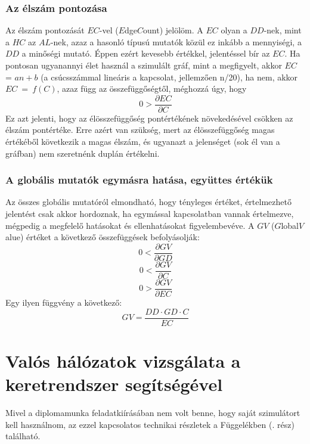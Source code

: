     \subsubsection{Az élszám pontozása}
    Az élszám pontozását $EC$-vel ($E$dge$C$ount) jelölöm. A $EC$ olyan a $DD$-nek, mint a $HC$ az $AL$-nek, azaz a hasonló típusú mutatók közül ez inkább a mennyiségi, a $DD$ a minőségi mutató. Éppen ezért kevesebb értékkel, jelentéssel bír az $EC$. Ha pontosan ugyanannyi élet használ a szimulált gráf, mint a megfigyelt, akkor $EC$ = $an + b$ (a csúcsszámmal lineáris a kapcsolat, jellemzően n/20), ha nem, akkor $EC~=~f(C)$, azaz függ az összefüggőségtől, méghozzá úgy, hogy
    $$0 > \frac{\partial EC}{\partial C}$$
    Ez azt jelenti, hogy az élösszefüggőség pontértékének növekedésével csökken az élszám pontértéke. Erre azért van szükség, mert az élösszefüggőség magas értékéből következik a magas élszám, és ugyanazt a jelenséget (sok él van a gráfban) nem szeretnénk duplán értékelni.

    \subsubsection{A globális mutatók egymásra hatása, együttes értékük}
    Az összes globális mutatóról elmondható, hogy tényleges értéket, értelmezhető jelentést csak akkor hordoznak, ha egymással kapcsolatban vannak értelmezve, mégpedig a megfelelő hatásokat és ellenhatásokat figyelembevéve. A $GV$ ($G$lobal$V$alue) értéket a következő összefüggések befolyásolják:
    $$0 < \frac{\partial GV}{\partial GD}$$
    $$0 < \frac{\partial GV}{\partial C}$$
    $$0 > \frac{\partial GV}{\partial EC}$$
    Egy ilyen függvény a következő:
    $$GV = \frac{DD \cdot GD \cdot C}{EC}$$

  \section{Valós hálózatok vizsgálata a keretrendszer segítségével}\label{section_real}
  Mivel a diplomamunka feladatkiírásában nem volt benne, hogy saját szimulátort kell használnom, az ezzel kapcsolatos technikai részletek a Függelékben (. rész) található.\\

